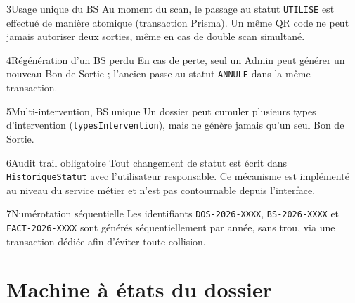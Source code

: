 \documentclass[11pt,a4paper]{report}
\begin{document}
\begin{regle}{3}{Usage unique du BS}
Au moment du scan, le passage au statut \texttt{UTILISE} est effectué de manière atomique
(transaction Prisma). Un même QR code ne peut jamais autoriser deux sorties, même en cas
de double scan simultané.
\end{regle}

\begin{regle}{4}{Régénération d'un BS perdu}
En cas de perte, seul un Admin peut générer un nouveau Bon de Sortie ; l'ancien passe au
statut \texttt{ANNULE} dans la même transaction.
\end{regle}

\begin{regle}{5}{Multi-intervention, BS unique}
Un dossier peut cumuler plusieurs types d'intervention (\texttt{typesIntervention}), mais
ne génère jamais qu'un seul Bon de Sortie.
\end{regle}

\begin{regle}{6}{Audit trail obligatoire}
Tout changement de statut est écrit dans \texttt{HistoriqueStatut} avec l'utilisateur
responsable. Ce mécanisme est implémenté au niveau du service métier et n'est pas
contournable depuis l'interface.
\end{regle}

\begin{regle}{7}{Numérotation séquentielle}
Les identifiants \texttt{DOS-2026-XXXX}, \texttt{BS-2026-XXXX} et \texttt{FACT-2026-XXXX}
sont générés séquentiellement par année, sans trou, via une transaction dédiée afin
d'éviter toute collision.
\end{regle}

\section{Machine à états du dossier}
\end{document}
